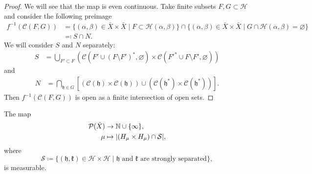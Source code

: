 \begin{proof}
  We will see that the map is even continuous. Take finite subsets \(F,G \subset \mathcal{H}\) and consider the following preimage
  \begin{align*}
    f^{-1}(\mathcal{C}(F, G))  & = \{(\alpha, \beta) \in \bar X \times \bar X \mid F \subset \mathcal{H}(\alpha, \beta) \} \cap \{(\alpha, \beta) \in \bar X \times \bar X  \mid G \cap \mathcal{H}(\alpha, \beta) = \varnothing\}\\
                                 &\eqqcolon S \cap N.
  \end{align*}
  We will consider \(S\) and \(N\) separately:
  \begin{align*}
    S & = \bigcup_{F' \subset F} \left( \mathcal{C}(F' \cup (F \setminus F')^\ast, \varnothing) \times \mathcal{C}(F'^\ast  \cup F \setminus F', \varnothing) \right)
  \end{align*}
  and
  \begin{align*}
    N & = \bigcap_{\mathfrak{h} \in G}\left[(\mathcal{C}(\mathfrak{h}) \times \mathcal{C}(\mathfrak{h})) \cup (\mathcal{C}(\mathfrak{h}^\ast) \times \mathcal{C}(\mathfrak{h}^\ast))\right].
  \end{align*}
  Then \(f^{-1}(\mathcal{C}(F,G))\) is open as a finite intersection of open sets.
\end{proof}

\begin{lemma}
  \label{lem:measurable-str-sep}
  The map
  \begin{align*}
    \mathcal{P}(\bar X) & \to \mathbb{N} \cup \{\infty\},\\
    \mu & \mapsto |(H_\mu\times H_\mu) \cap \mathcal{S}|,
  \end{align*}
  where
  \[
    \mathcal{S}\coloneqq \{(\mathfrak{h},\mathfrak{k}) \in \mathcal{H} \times \mathcal{H} \mid \mathfrak{h} \text{ and } \mathfrak{k} \text{ are strongly separated}\},
  \]
  is measurable.
\end{lemma}


